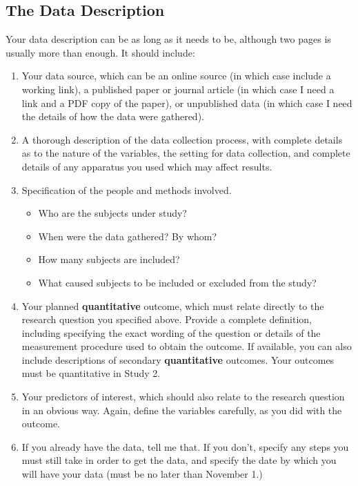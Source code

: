 \documentclass[]{book}
\providecommand{\tightlist}{%
  \setlength{\itemsep}{0pt}\setlength{\parskip}{0pt}}
\theoremstyle{definition}
\theoremstyle{definition}
\theoremstyle{definition}
\theoremstyle{remark}
\begin{document}
\hypertarget{the-data-description}{%
\subsection{The Data Description}\label{the-data-description}}

Your data description can be as long as it needs to be, although two
pages is usually more than enough. It should include:

\begin{enumerate}
\def\labelenumi{\arabic{enumi}.}
\item
  Your data source, which can be an online source (in which case include
  a working link), a published paper or journal article (in which case I
  need a link and a PDF copy of the paper), or unpublished data (in
  which case I need the details of how the data were gathered).
\item
  A thorough description of the data collection process, with complete
  details as to the nature of the variables, the setting for data
  collection, and complete details of any apparatus you used which may
  affect results.
\item
  Specification of the people and methods involved.

  \begin{itemize}
  \tightlist
  \item
    Who are the subjects under study?
  \item
    When were the data gathered? By whom?
  \item
    How many subjects are included?
  \item
    What caused subjects to be included or excluded from the study?
  \end{itemize}
\item
  Your planned \textbf{quantitative} outcome, which must relate directly
  to the research question you specified above. Provide a complete
  definition, including specifying the exact wording of the question or
  details of the measurement procedure used to obtain the outcome. If
  available, you can also include descriptions of secondary
  \textbf{quantitative} outcomes. Your outcomes must be quantitative in
  Study 2.
\item
  Your predictors of interest, which should also relate to the research
  question in an obvious way. Again, define the variables carefully, as
  you did with the outcome.
\item
  If you already have the data, tell me that. If you don't, specify any
  steps you must still take in order to get the data, and specify the
  date by which you will have your data (must be no later than November
  1.)
\end{enumerate}
\end{document}
